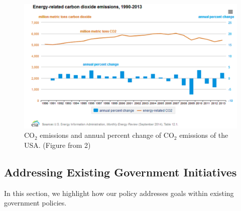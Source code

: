 \begin{figure}
\begin{center}
\includegraphics[scale=0.3]{pics/d2.png}
\caption{CO$_{2}$ emissions and annual percent change of CO$_{2}$ emissions of the USA. (Figure from \cite{debbie}{2})}
\label{d2}
\end{center}
\end{figure}

\subsection{Addressing Existing Government Initiatives}
In this section, we highlight how our policy addresses goals within existing government policies.

